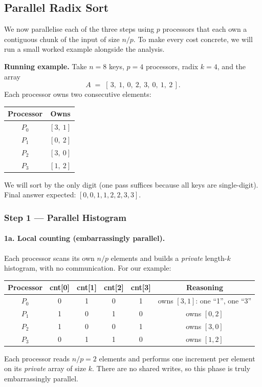 \subsection{Parallel Radix Sort}
\label{sec:parallel-radix}

We now parallelise each of the three steps using $p$ processors that
each own a contiguous chunk of the input of size $n/p$. To make every
cost concrete, we will run a small worked example alongside the
analysis.

\begin{ppexample}
\textbf{Running example.} Take $n = 8$ keys, $p = 4$ processors, radix
$k = 4$, and the array
\[
A \;=\; [\,3,\ 1,\ 0,\ 2,\ 3,\ 0,\ 1,\ 2\,].
\]
Each processor owns two consecutive elements:
\begin{center}
\begin{tabular}{cc}
\toprule
\textbf{Processor} & \textbf{Owns} \\
\midrule
$P_0$ & $[3,\ 1]$ \\
$P_1$ & $[0,\ 2]$ \\
$P_2$ & $[3,\ 0]$ \\
$P_3$ & $[1,\ 2]$ \\
\bottomrule
\end{tabular}
\end{center}
We will sort by the only digit (one pass suffices because all keys are
single-digit). Final answer expected: $[0,0,1,1,2,2,3,3]$.
\end{ppexample}

\subsubsection{Step 1 --- Parallel Histogram}

\paragraph{1a. Local counting (embarrassingly parallel).}
Each processor scans its own $n/p$ elements and builds a \emph{private}
length-$k$ histogram, with no communication.
For our example:
\begin{center}
\begin{tabular}{c|cccc|c}
\toprule
\textbf{Processor} & \textbf{cnt[0]} & \textbf{cnt[1]} & \textbf{cnt[2]} & \textbf{cnt[3]}
                   & \textbf{Reasoning} \\
\midrule
$P_0$ & 0 & 1 & 0 & 1 & owns $[3,1]$: one ``1'', one ``3'' \\
$P_1$ & 1 & 0 & 1 & 0 & owns $[0,2]$ \\
$P_2$ & 1 & 0 & 0 & 1 & owns $[3,0]$ \\
$P_3$ & 0 & 1 & 1 & 0 & owns $[1,2]$ \\
\bottomrule
\end{tabular}
\end{center}
Each processor reads $n/p = 2$ elements and performs one increment per
element on its \emph{private} array of size $k$. There are no shared
writes, so this phase is truly embarrassingly parallel.

